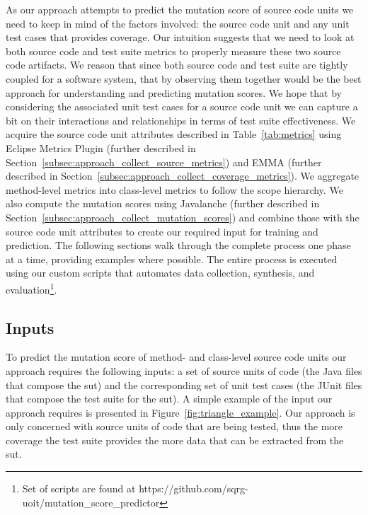 As our approach attempts to predict the mutation score of source code units we need to keep in mind of the factors involved: the source code unit and any unit test cases that provides coverage. Our intuition suggests that we need to look at both source code and test suite metrics to properly measure these two source code artifacts. We reason that since both source code and test suite are tightly coupled for a software system, that by observing them together would be the best approach for understanding and predicting mutation scores. We hope that by considering the associated unit test cases for a source code unit we can capture a bit on their interactions and relationships in terms of test suite effectiveness. We acquire the source code unit attributes described in Table~\ref{tab:metrics} using Eclipse Metrics Plugin (further described in Section~\ref{subsec:approach_collect_source_metrics}) and EMMA (further described in Section~\ref{subsec:approach_collect_coverage_metrics}). We aggregate method-level metrics into class-level metrics to follow the scope hierarchy. We also compute the mutation scores using Javalanche (further described in Section~\ref{subsec:approach_collect_mutation_scores}) and combine those with the source code unit attributes to create our required input for training and prediction. The following sections walk through the complete process one phase at a time, providing examples where possible. The entire process is executed using our custom scripts that automates data collection, synthesis, and evaluation\footnote{Set of scripts are found at https://github.com/sqrg-uoit/mutation\_score\_predictor}.


\subsection{Inputs}
\label{subsec:approach_inputs}
To predict the mutation score of method- and class-level source code units our approach requires the following inputs: a set of source units of code (the Java files that compose the \gls{sut}) and the corresponding set of unit test cases (the JUnit files that compose the test suite for the \gls{sut}). A simple example of the input our approach requires is presented in Figure~\ref{fig:triangle_example}. Our approach is only concerned with source units of code that are being tested, thus the more coverage the test suite provides the more data that can be extracted from the \gls{sut}.


